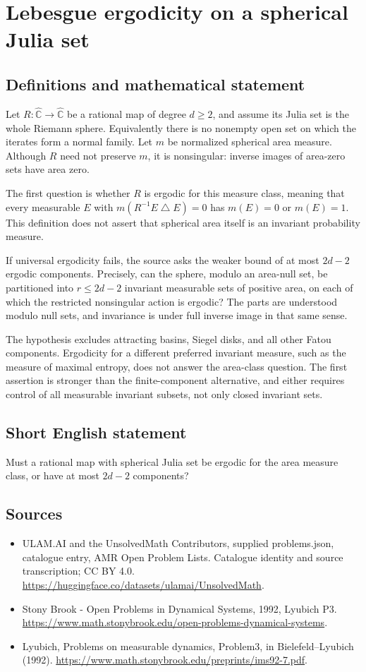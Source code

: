 \documentclass[11pt,a4paper]{article}
\begin{document}
\section*{Lebesgue ergodicity on a spherical Julia set}\label{statement}

\subsection{Definitions and mathematical statement}
Let $R:\widehat{\mathbb C}\to\widehat{\mathbb C}$ be a rational map of
degree $d\ge2$, and assume its Julia set is the whole Riemann sphere.
Equivalently there is no nonempty open set on which the iterates form
a normal family. Let $m$ be normalized spherical area measure.
Although $R$ need not preserve $m$, it is nonsingular: inverse images
of area-zero sets have area zero.

The first question is whether $R$ is ergodic for this measure class,
meaning that every measurable $E$ with
$m(R^{-1}E\mathbin{\triangle} E)=0$ has $m(E)=0$ or $m(E)=1$.
This definition does not assert that spherical area itself is an
invariant probability measure.

If universal ergodicity fails, the source asks the weaker bound of
at most $2d-2$ ergodic components. Precisely, can the sphere, modulo
an area-null set, be partitioned into $r\le2d-2$ invariant measurable
sets of positive area, on each of which the restricted nonsingular
action is ergodic? The parts are understood modulo null sets, and
invariance is under full inverse image in that same sense.

The hypothesis excludes attracting basins, Siegel disks, and all other
Fatou components. Ergodicity for a different preferred invariant
measure, such as the measure of maximal entropy, does not answer
the area-class question. The first assertion is stronger than the
finite-component alternative, and either requires control of all
measurable invariant subsets, not only closed invariant sets.
\subsection{Short English statement}
Must a rational map with spherical Julia set be ergodic for the area measure class, or have at most $2d-2$ components?
\subsection{Sources}
\begin{itemize}
\item[S1] ULAM.AI and the UnsolvedMath Contributors, supplied problems.json, catalogue entry, AMR Open Problem Lists. Catalogue identity and source transcription; CC BY 4.0.
\url{https://huggingface.co/datasets/ulamai/UnsolvedMath}.
\item[S2] Stony Brook - Open Problems in Dynamical Systems, 1992, Lyubich P3. 
\url{https://www.math.stonybrook.edu/open-problems-dynamical-systems}.
\item[S3] Lyubich, Problems on measurable dynamics, Problem3, in Bielefeld–Lyubich (1992).
\url{https://www.math.stonybrook.edu/preprints/ims92-7.pdf}.
\end{itemize}
\end{document}
